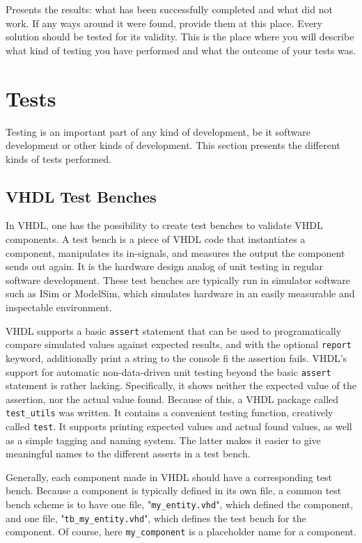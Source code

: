Presents the results: what has been successfully completed and what did not work.
If any ways around it were found, provide them at this place.
Every solution should be tested for its validity.
This is the place where you will describe what kind of testing you have performed and what the outcome of your tests was.

\section{Tests}

Testing is an important part of any kind of development, be it software development or other kinds of development.
This section presents the different kinds of tests performed.

\subsection{VHDL Test Benches}

In VHDL, one has the possibility to create test benches to validate VHDL components.
A test bench is a piece of VHDL code that instantiates a component, manipulates its in-signals, and measures the output the component sends out again.
It is the hardware design analog of unit testing in regular software development.
These test benches are typically run in simulator software such as ISim or ModelSim, which simulates hardware in an easily measurable and inspectable environment.

VHDL supports a basic \texttt{assert} statement that can be used to programatically compare simulated values against expected results, and with the optional \texttt{report} keyword, additionally print a string to the console fi the assertion fails.
VHDL's support for automatic non-data-driven unit testing beyond the basic \texttt{assert} statement is rather lacking.
Specifically, it shows neither the expected value of the assertion, nor the actual value found.
Because of this, a VHDL package called \texttt{test\_utils} was written.
It contains a convenient testing function, creatively called \texttt{test}.
It supports printing expected values and actual found values, as well as a simple tagging and naming system.
The latter makes it easier to give meaningful names to the different asserts in a test bench.

Generally, each component made in VHDL should have a corresponding test bench.
Because a component is typically defined in its own file, a common test bench scheme is to have one file, "\texttt{my\_entity.vhd}", which defined the component, and one file, "\texttt{tb\_my\_entity.vhd}", which defines the test bench for the component.
Of course, here \texttt{my\_component} is a placeholder name for a component.

